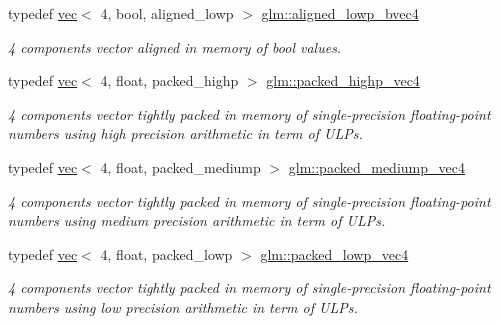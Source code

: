 \begin{DoxyCompactItemize}
typedef \hyperlink{structglm_1_1vec}{vec}$<$ 4, bool, aligned\+\_\+lowp $>$ \hyperlink{group__gtc__type__aligned_ga7584318e96ebbf1e7649a7af7724ecca}{glm\+::aligned\+\_\+lowp\+\_\+bvec4}
\begin{DoxyCompactList}\small\item\em 4 components vector aligned in memory of bool values. \end{DoxyCompactList}\item 
\mbox{\label{group__gtc__type__aligned_gabbc42b2b5ad854c60821526c4e291161}} 
typedef \hyperlink{structglm_1_1vec}{vec}$<$ 4, float, packed\+\_\+highp $>$ \hyperlink{group__gtc__type__aligned_gabbc42b2b5ad854c60821526c4e291161}{glm\+::packed\+\_\+highp\+\_\+vec4}
\begin{DoxyCompactList}\small\item\em 4 components vector tightly packed in memory of single-\/precision floating-\/point numbers using high precision arithmetic in term of U\+L\+Ps. \end{DoxyCompactList}\item 
\mbox{\label{group__gtc__type__aligned_ga18f1166b7888d6e0d7d659f5a022e6ea}} 
typedef \hyperlink{structglm_1_1vec}{vec}$<$ 4, float, packed\+\_\+mediump $>$ \hyperlink{group__gtc__type__aligned_ga18f1166b7888d6e0d7d659f5a022e6ea}{glm\+::packed\+\_\+mediump\+\_\+vec4}
\begin{DoxyCompactList}\small\item\em 4 components vector tightly packed in memory of single-\/precision floating-\/point numbers using medium precision arithmetic in term of U\+L\+Ps. \end{DoxyCompactList}\item 
\mbox{\label{group__gtc__type__aligned_ga35756405558e0f3cd7d194f07d557276}} 
typedef \hyperlink{structglm_1_1vec}{vec}$<$ 4, float, packed\+\_\+lowp $>$ \hyperlink{group__gtc__type__aligned_ga35756405558e0f3cd7d194f07d557276}{glm\+::packed\+\_\+lowp\+\_\+vec4}
\begin{DoxyCompactList}\small\item\em 4 components vector tightly packed in memory of single-\/precision floating-\/point numbers using low precision arithmetic in term of U\+L\+Ps. \end{DoxyCompactList}\item 
\mbox{\label{group__gtc__type__aligned_ga7eb6a2440202876a3a223a1931dd496a}} 

\end{DoxyCompactItemize}
